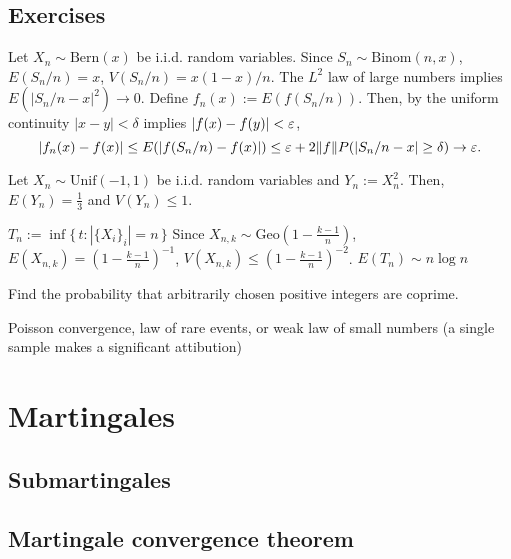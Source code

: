 \documentclass{../note}
\def\Unif{\mathrm{Unif}}
\def\Bern{\mathrm{Bern}}
\def\Binom{\mathrm{Binom}}
\def\Geo{\mathrm{Geo}}
\begin{document}
\section*{Exercises}
\begin{prb}
Let $X_n\sim\Bern(x)$ be i.i.d. random variables.
Since $S_n\sim\Binom(n,x)$, $E(S_n/n)=x$, $V(S_n/n)=x(1-x)/n$.
The $L^2$ law of large numbers implies $E(|S_n/n-x|^2)\to0$.
Define $f_n(x):=E(f(S_n/n))$.
Then, by the uniform continuity $|x-y|<\delta$ implies $|f(x)-f(y)|<\varepsilon$,
\[|f_n(x)-f(x)|\le E(|f(S_n/n)-f(x)|)\le\varepsilon+2\|f\|P(|S_n/n-x|\ge\delta)\to\varepsilon.\]
\end{prb}
\begin{prb}
Let $X_n\sim\Unif(-1,1)$ be i.i.d. random variables and $Y_n:=X_n^2$.
Then, $E(Y_n)=\frac13$ and $V(Y_n)\le1$.
\end{prb}
\begin{prb}
$T_n:=\inf\{\,t:|\{X_i\}_i|=n\,\}$
Since $X_{n,k}\sim\Geo(1-\frac{k-1}n)$, $E(X_{n,k})=(1-\frac{k-1}n)^{-1}$, $V(X_{n,k})\le(1-\frac{k-1}n)^{-2}$.
$E(T_n)\sim n\log n$
\end{prb}
\begin{prb}
\end{prb}
\begin{prb}
\end{prb}

\begin{prb}
Find the probability that arbitrarily chosen positive integers are coprime.
\end{prb}




Poisson convergence, law of rare events, or weak law of small numbers (a single sample makes a significant attibution)









\chapter{Martingales}
\section{Submartingales}
\section{Martingale convergence theorem}
\begin{prb}
\begin{parts}
\item
\end{parts}
\end{prb}
\end{document}
